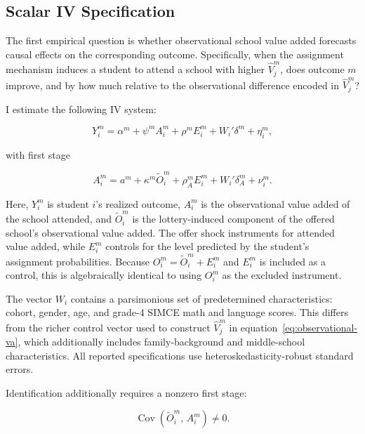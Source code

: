 \documentclass[a4paper, article, english, oneside, unknownkeysallowed, 12pt]{memoir}
\begin{document}
\subsection{Scalar IV Specification}

The first empirical question is whether observational school value added forecasts causal
effects on the corresponding outcome. Specifically, when the assignment mechanism
induces a student to attend a school with higher $\widehat V_j^m$, does outcome $m$
improve, and by how much relative to the observational difference encoded in
$\widehat V_j^m$?

I estimate the following IV system:

\begin{equation}
    Y_i^m
    =
    \alpha^m
    +
    \psi^m A_i^m
    +
    \rho^m E_i^m
    +
    W_i'\delta^m
    +
    \eta_i^m,
    \label{eq:pass-through}
\end{equation}

with first stage

\begin{equation}
    A_i^m
    =
    a^m
    +
    \kappa^m \widetilde O_i^m
    +
    \rho_A^m E_i^m
    +
    W_i'\delta_A^m
    +
    \nu_i^m.
    \label{eq:first-stage}
\end{equation}

Here, $Y_i^m$ is student $i$'s realized outcome, $A_i^m$ is the observational value
added of the school attended, and $\widetilde O_i^m$ is the lottery-induced component of
the offered school's observational value added. The offer shock instruments for attended
value added, while $E_i^m$ controls for the level predicted by the student's assignment
probabilities. Because $O_i^m=\widetilde O_i^m+E_i^m$ and $E_i^m$ is included as a control,
this is algebraically identical to using $O_i^m$ as the excluded instrument.

The vector $W_i$ contains a parsimonious set of predetermined characteristics: cohort,
gender, age, and grade-4 SIMCE math and language scores. This differs from the richer
control vector used to construct $\widehat V_j^m$ in
equation~\eqref{eq:observational-va}, which additionally includes family-background and
middle-school characteristics. All reported specifications use heteroskedasticity-robust
standard errors.

Identification additionally requires a nonzero first stage:

\begin{equation}
    \operatorname{Cov}
    \left(
        \widetilde O_i^m,\,
        A_i^m
    \right)
    \neq 0.
    \label{eq:rank-condition}
\end{equation}
\end{document}
